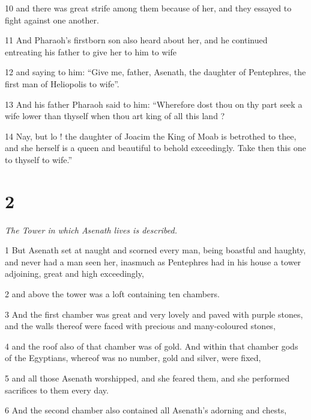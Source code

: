 \par 10 and there was great strife among them because of her, and they essayed to fight against one another. 

\par 11 And Pharaoh's firstborn son also heard about her, and he continued entreating his father to give her to him to wife 

\par 12 and saying to him: “Give me, father, Asenath, the daughter of Pentephres, the first man of Heliopolis to wife”. 

\par 13 And his father Pharaoh said to him: “Wherefore dost thou on thy part seek a wife lower than thyself when thou art king of all this land ? 

\par 14 Nay, but lo ! the daughter of Joacim the King of Moab is betrothed to thee, and she herself is a queen and beautiful to behold exceedingly. Take then this one to thyself to wife.”

\chapter{2}

\par \textit{The Tower in which Asenath lives is described.}

\par 1 But Asenath set at naught and scorned every man, being boastful and haughty, and never had a man seen her, inasmuch as Pentephres had in his house a tower adjoining, great and high exceedingly, 

\par 2 and above the tower was a loft containing ten chambers. 

\par 3 And the first chamber was great and very lovely and paved with purple stones, and the walls thereof were faced with precious and many-coloured stones, 

\par 4 and the roof also of that chamber was of gold. And within that chamber gods of the Egyptians, whereof was no number, gold and silver, were fixed, 

\par 5 and all those Asenath worshipped, and she feared them, and she performed sacrifices to them every day. 

\par 6 And the second chamber also contained all Asenath's adorning and chests, 

